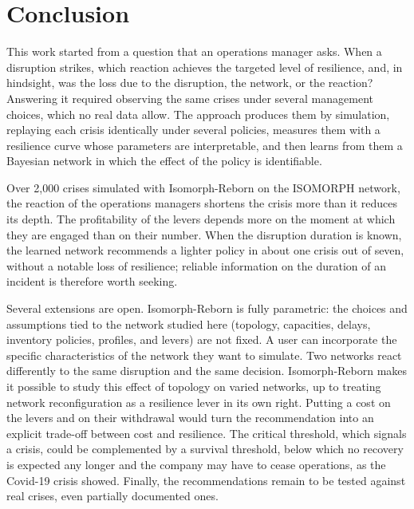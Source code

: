 \section{Conclusion}
\label{sec:6}

This work started from a question that an operations manager asks. When a disruption strikes, which reaction achieves the targeted level of resilience, and, in hindsight, was the loss due to the disruption, the network, or the reaction? Answering it required observing the same crises under several management choices, which no real data allow. The approach produces them by simulation, replaying each crisis identically under several policies, measures them with a resilience curve whose parameters are interpretable, and then learns from them a Bayesian network in which the effect of the policy is identifiable.

Over 2,000 crises simulated with Isomorph-Reborn on the ISOMORPH network, the reaction of the operations managers shortens the crisis more than it reduces its depth. The profitability of the levers depends more on the moment at which they are engaged than on their number. When the disruption duration is known, the learned network recommends a lighter policy in about one crisis out of seven, without a notable loss of resilience; reliable information on the duration of an incident is therefore worth seeking.

Several extensions are open. Isomorph-Reborn is fully parametric: the choices and assumptions tied to the network studied here (topology, capacities, delays, inventory policies, profiles, and levers) are not fixed. A user can incorporate the specific characteristics of the network they want to simulate. Two networks react differently to the same disruption and the same decision. Isomorph-Reborn makes it possible to study this effect of topology on varied networks, up to treating network reconfiguration as a resilience lever in its own right. Putting a cost on the levers and on their withdrawal would turn the recommendation into an explicit trade-off between cost and resilience. The critical threshold, which signals a crisis, could be complemented by a survival threshold, below which no recovery is expected any longer and the company may have to cease operations, as the Covid-19 crisis showed. Finally, the recommendations remain to be tested against real crises, even partially documented ones.
